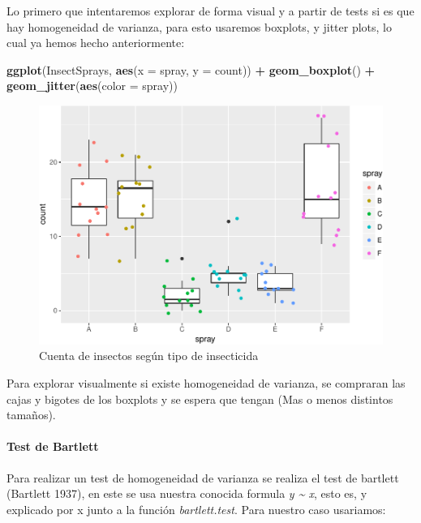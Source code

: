 \documentclass[]{article}
\newenvironment{Shaded}{\begin{snugshade}}{\end{snugshade}}
\newcommand{\KeywordTok}[1]{\textcolor[rgb]{0.13,0.29,0.53}{\textbf{#1}}}
\newcommand{\DataTypeTok}[1]{\textcolor[rgb]{0.13,0.29,0.53}{#1}}
\newcommand{\StringTok}[1]{\textcolor[rgb]{0.31,0.60,0.02}{#1}}
\newcommand{\OperatorTok}[1]{\textcolor[rgb]{0.81,0.36,0.00}{\textbf{#1}}}
\newcommand{\NormalTok}[1]{#1}
\let\oldparagraph\paragraph
\renewcommand{\paragraph}[1]{\oldparagraph{#1}\mbox{}}
\begin{document}
Lo primero que intentaremos explorar de forma visual y a partir de tests
si es que hay homogeneidad de varianza, para esto usaremos boxplots, y
jitter plots, lo cual ya hemos hecho anteriormente:

\begin{Shaded}
\begin{Highlighting}[]
\KeywordTok{ggplot}\NormalTok{(InsectSprays, }\KeywordTok{aes}\NormalTok{(}\DataTypeTok{x =}\NormalTok{ spray, }\DataTypeTok{y =}\NormalTok{ count)) }\OperatorTok{+}\StringTok{ }\KeywordTok{geom_boxplot}\NormalTok{() }\OperatorTok{+}\StringTok{ }\KeywordTok{geom_jitter}\NormalTok{(}\KeywordTok{aes}\NormalTok{(}\DataTypeTok{color =}\NormalTok{ spray)) }
\end{Highlighting}
\end{Shaded}

\begin{figure}
\centering
\includegraphics{Guia3_files/figure-latex/unnamed-chunk-1-1.pdf}
\caption{Cuenta de insectos según tipo de insecticida}
\end{figure}

Para explorar visualmente si existe homogeneidad de varianza, se
compraran las cajas y bigotes de los boxplots y se espera que tengan
(Mas o menos distintos tamaños).

\paragraph{Test de Bartlett}\label{test-de-bartlett}

Para realizar un test de homogeneidad de varianza se realiza el test de
bartlett (Bartlett 1937), en este se usa nuestra conocida formula
\emph{y \textasciitilde{} x}, esto es, y explicado por x junto a la
función \emph{bartlett.test}. Para nuestro caso usariamos:
\end{document}
